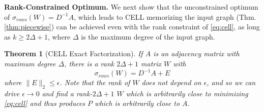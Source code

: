 \documentclass{article}
\newcommand{\todo}[1]{\textcolor{blue}{TODO: #1}}
\newtheorem{theorem}{Theorem}
\newcommand{\norm}[1]{\|#1\|}
\begin{document}
\noindent \textbf{Rank-Constrained Optimum.}
We next show that the unconstrained optimum of $\sigma_{rows}(W) = D^{-1} A$, which leads to CELL memorizing the input graph (Thm. \ref{thm:piecewise}) can be achieved even with the rank constraint of \eqref{eq:cell}, as long as $k \ge 2\Delta+1$, where $\Delta$ is the maximum degree of the input graph. 
\begin{theorem}[CELL Exact Factorization]\label{thm:exact}
If $A$ is an adjacency matrix with maximum degree $\Delta$, there is a rank $2\Delta+1$ matrix $W$ with 
$$\sigma_{rows}(W) = D^{-1}A + E$$
where $\norm{E}_2 \le \epsilon$. Note that  the rank of $W$ does not depend on $\epsilon$, and so we can drive $\epsilon \rightarrow 0$ and find a rank-$2\Delta+1$ $W$ which is arbitrarily close to minimizing \eqref{eq:cell} and thus produces $P$ which is arbitrarily close to $A$.
\end{theorem}
%
%
%
\end{document}
